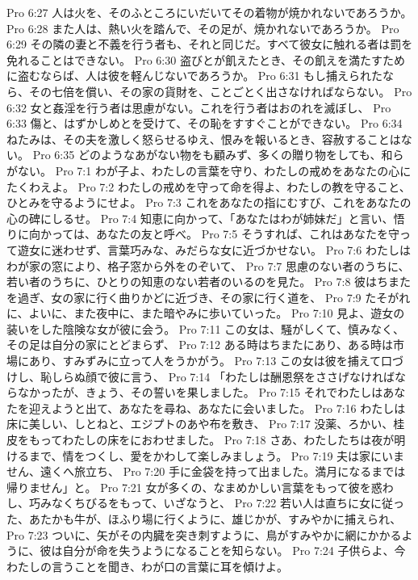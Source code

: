 Pro 6:27  人は火を、そのふところにいだいてその着物が焼かれないであろうか。
Pro 6:28  また人は、熱い火を踏んで、その足が、焼かれないであろうか。
Pro 6:29  その隣の妻と不義を行う者も、それと同じだ。すべて彼女に触れる者は罰を免れることはできない。
Pro 6:30  盗びとが飢えたとき、その飢えを満たすために盗むならば、人は彼を軽んじないであろうか。
Pro 6:31  もし捕えられたなら、その七倍を償い、その家の貨財を、ことごとく出さなければならない。
Pro 6:32  女と姦淫を行う者は思慮がない。これを行う者はおのれを滅ぼし、
Pro 6:33  傷と、はずかしめとを受けて、その恥をすすぐことができない。
Pro 6:34  ねたみは、その夫を激しく怒らせるゆえ、恨みを報いるとき、容赦することはない。
Pro 6:35  どのようなあがない物をも顧みず、多くの贈り物をしても、和らがない。
Pro 7:1  わが子よ、わたしの言葉を守り、わたしの戒めをあなたの心にたくわえよ。
Pro 7:2  わたしの戒めを守って命を得よ、わたしの教を守ること、ひとみを守るようにせよ。
Pro 7:3  これをあなたの指にむすび、これをあなたの心の碑にしるせ。
Pro 7:4  知恵に向かって、「あなたはわが姉妹だ」と言い、悟りに向かっては、あなたの友と呼べ。
Pro 7:5  そうすれば、これはあなたを守って遊女に迷わせず、言葉巧みな、みだらな女に近づかせない。
Pro 7:6  わたしはわが家の窓により、格子窓から外をのぞいて、
Pro 7:7  思慮のない者のうちに、若い者のうちに、ひとりの知恵のない若者のいるのを見た。
Pro 7:8  彼はちまたを過ぎ、女の家に行く曲りかどに近づき、その家に行く道を、
Pro 7:9  たそがれに、よいに、また夜中に、また暗やみに歩いていった。
Pro 7:10  見よ、遊女の装いをした陰険な女が彼に会う。
Pro 7:11  この女は、騒がしくて、慎みなく、その足は自分の家にとどまらず、
Pro 7:12  ある時はちまたにあり、ある時は市場にあり、すみずみに立って人をうかがう。
Pro 7:13  この女は彼を捕えて口づけし、恥しらぬ顔で彼に言う、
Pro 7:14  「わたしは酬恩祭をささげなければならなかったが、きょう、その誓いを果しました。
Pro 7:15  それでわたしはあなたを迎えようと出て、あなたを尋ね、あなたに会いました。
Pro 7:16  わたしは床に美しい、しとねと、エジプトのあや布を敷き、
Pro 7:17  没薬、ろかい、桂皮をもってわたしの床をにおわせました。
Pro 7:18  さあ、わたしたちは夜が明けるまで、情をつくし、愛をかわして楽しみましょう。
Pro 7:19  夫は家にいません、遠くへ旅立ち、
Pro 7:20  手に金袋を持って出ました。満月になるまでは帰りません」と。
Pro 7:21  女が多くの、なまめかしい言葉をもって彼を惑わし、巧みなくちびるをもって、いざなうと、
Pro 7:22  若い人は直ちに女に従った、あたかも牛が、ほふり場に行くように、雄じかが、すみやかに捕えられ、
Pro 7:23  ついに、矢がその内臓を突き刺すように、鳥がすみやかに網にかかるように、彼は自分が命を失うようになることを知らない。
Pro 7:24  子供らよ、今わたしの言うことを聞き、わが口の言葉に耳を傾けよ。
